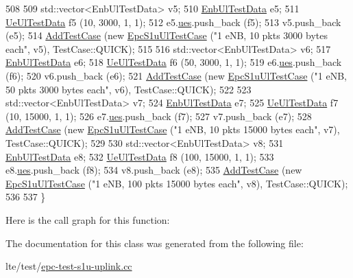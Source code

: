 \begin{DoxyCode}
508 
509   std::vector<EnbUlTestData> v5;  
510   \hyperlink{structEnbUlTestData}{EnbUlTestData} e5;
511   \hyperlink{structUeUlTestData}{UeUlTestData} f5 (10, 3000, 1, 1);
512   e5.\hyperlink{structEnbUlTestData_a66bd6b7f7c3c77824fcb76fa72aa5237}{ues}.push\_back (f5);
513   v5.push\_back (e5);
514   \hyperlink{classns3_1_1TestCase_a3718088e3eefd5d6454569d2e0ddd835}{AddTestCase} (\textcolor{keyword}{new} \hyperlink{classEpcS1uUlTestCase}{EpcS1uUlTestCase} (\textcolor{stringliteral}{"1 eNB, 10 pkts 3000 bytes each"}, v5), 
      TestCase::QUICK);
515 
516   std::vector<EnbUlTestData> v6;  
517   \hyperlink{structEnbUlTestData}{EnbUlTestData} e6;
518   \hyperlink{structUeUlTestData}{UeUlTestData} f6 (50, 3000, 1, 1);
519   e6.\hyperlink{structEnbUlTestData_a66bd6b7f7c3c77824fcb76fa72aa5237}{ues}.push\_back (f6);
520   v6.push\_back (e6);
521   \hyperlink{classns3_1_1TestCase_a3718088e3eefd5d6454569d2e0ddd835}{AddTestCase} (\textcolor{keyword}{new} \hyperlink{classEpcS1uUlTestCase}{EpcS1uUlTestCase} (\textcolor{stringliteral}{"1 eNB, 50 pkts 3000 bytes each"}, v6), 
      TestCase::QUICK);
522 
523   std::vector<EnbUlTestData> v7;  
524   \hyperlink{structEnbUlTestData}{EnbUlTestData} e7;
525   \hyperlink{structUeUlTestData}{UeUlTestData} f7 (10, 15000, 1, 1);
526   e7.\hyperlink{structEnbUlTestData_a66bd6b7f7c3c77824fcb76fa72aa5237}{ues}.push\_back (f7);
527   v7.push\_back (e7);
528   \hyperlink{classns3_1_1TestCase_a3718088e3eefd5d6454569d2e0ddd835}{AddTestCase} (\textcolor{keyword}{new} \hyperlink{classEpcS1uUlTestCase}{EpcS1uUlTestCase} (\textcolor{stringliteral}{"1 eNB, 10 pkts 15000 bytes each"}, v7), 
      TestCase::QUICK);
529 
530   std::vector<EnbUlTestData> v8;  
531   \hyperlink{structEnbUlTestData}{EnbUlTestData} e8;
532   \hyperlink{structUeUlTestData}{UeUlTestData} f8 (100, 15000, 1, 1);
533   e8.\hyperlink{structEnbUlTestData_a66bd6b7f7c3c77824fcb76fa72aa5237}{ues}.push\_back (f8);
534   v8.push\_back (e8);
535   \hyperlink{classns3_1_1TestCase_a3718088e3eefd5d6454569d2e0ddd835}{AddTestCase} (\textcolor{keyword}{new} \hyperlink{classEpcS1uUlTestCase}{EpcS1uUlTestCase} (\textcolor{stringliteral}{"1 eNB, 100 pkts 15000 bytes each"}, v8), 
      TestCase::QUICK);
536   
537 \}
\end{DoxyCode}


Here is the call graph for this function\+:




The documentation for this class was generated from the following file\+:\begin{DoxyCompactItemize}
\item 
lte/test/\hyperlink{epc-test-s1u-uplink_8cc}{epc-\/test-\/s1u-\/uplink.\+cc}\end{DoxyCompactItemize}
